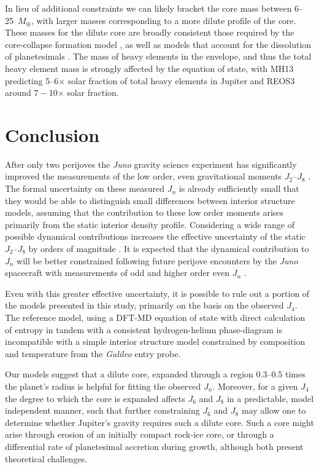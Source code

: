 In lieu of additional constraints we can likely bracket the core mass between
6--25~$M_\oplus$, with larger masses corresponding to a more dilute profile of
the core. These  masses for the dilute core are broadly consistent those
required by the core-collapse formation model \cite{Pollack1996}, as well as
models  that account for the dissolution of planetesimals \citep{lozovsky2017}.
The mass of heavy elements in the envelope, and thus the total heavy element
mass is strongly affected by the equation of state, with MH13 predicting
5--6$\times$ solar fraction of total heavy elements in Jupiter and REOS3 around 
$7-10$$\times$ solar fraction.


\section{Conclusion} \label{sec:conclusion}

After only two perijoves the \textit{Juno} gravity science experiment has
significantly improved the measurements of the low order, even gravitational
moments $J_2$--$J_8$ \citep{Folkner2017}. The formal uncertainty on these
measured $J_n$ is already sufficiently small that they would be able to
distinguish small differences between interior structure models, assuming that
the contribution to these low order moments arises primarily from the static
interior density profile. Considering a wide range of possible dynamical
contributions increases the effective uncertainty of the static $J_2$--$J_8$ by
orders of magnitude \citep{Kaspi2017}. It is expected that the dynamical
contribution to $J_n$ will be better constrained following future perijove
encounters by the \textit{Juno} spacecraft with measurements of odd and higher
order even $J_n$ \citep{Kaspi2013}. 

Even with this greater effective uncertainty, it is possible to rule out
a portion of the models presented in this study, primarily on the basis on the
observed $J_4$. The reference model, using a DFT-MD equation of state with
direct calculation of entropy in tandem with a consistent hydrogen-helium
phase-diagram is incompatible with a simple interior structure  model
constrained by composition and temperature from the \textit{Galileo} entry
probe. 

Our models suggest that a dilute core, expanded through a region 0.3--0.5
times the planet's radius is helpful for fitting the observed $J_n$.  Moreover,
for a given $J_4$ the degree to which the core is expanded affects $J_6$ and
$J_8$ in a predictable, model independent manner, such that further
constraining $J_6$ and $J_8$ may allow one to determine whether Jupiter's
gravity requires such a dilute core. Such a core might arise through erosion
of an initially compact rock-ice core, or through a differential rate of
planetesimal accretion during growth, although both present theoretical
challenges.

